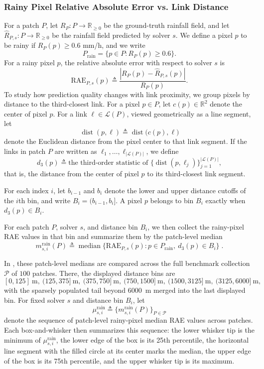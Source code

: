\documentclass[11pt]{article}
\begin{document}
\subsubsection{Rainy Pixel Relative Absolute Error vs. Link Distance}
For a patch $P$, let $R_P : P \to \mathbb{R}_{\ge 0}$ be the ground-truth rainfall field, and let $\widehat{R}_{P,s} : P \to \mathbb{R}_{\ge 0}$ be the rainfall field predicted by solver $s$. We define a pixel $p$ to be rainy if $R_P(p) \ge 0.6$ mm/h, and we write
\[
P_{\mathrm{rain}}=\{p \in P : R_P(p)\ge 0.6\}.
\]
For a rainy pixel $p$, the relative absolute error with respect to solver $s$ is
\[
\mathrm{RAE}_{P,s}(p)\triangleq\frac{|R_P(p)-\widehat{R}_{P,s}(p)|}{R_P(p)}.
\]
To study how prediction quality changes with link proximity, we group pixels by distance to the third-closest link. For a pixel $p\in P$, let $c(p)\in\mathbb{R}^2$ denote the center of pixel $p$. For a link $\ell\in\mathcal{L}(P)$, viewed geometrically as a line segment, let
\[
\operatorname{dist}(p,\ell)\triangleq \operatorname{dist}\bigl(c(p),\ell\bigr)
\]
denote the Euclidean distance from the pixel center to that link segment. If the links in patch $P$ are written as $\ell_1,\dots,\ell_{|\mathcal{L}(P)|}$, we define
\[
d_3(p)\triangleq \text{the third-order statistic of } \bigl\{\operatorname{dist}(p,\ell_j)\bigr\}_{j=1}^{|\mathcal{L}(P)|},
\]
that is, the distance from the center of pixel $p$ to its third-closest link segment.

For each index $i$, let $b_{i-1}$ and $b_i$ denote the lower and upper distance cutoffs of the $i$th bin, and write $B_i=(b_{i-1},b_i]$. A pixel $p$ belongs to bin $B_i$ exactly when $d_3(p)\in B_i$.

For each patch $P$, solver $s$, and distance bin $B_i$, we then collect the rainy-pixel RAE values in that bin and summarize them by the patch-level median
\[
m_{s,i}^{\mathrm{rain}}(P)\triangleq
\operatorname{median}\bigl\{\mathrm{RAE}_{P,s}(p): p\in 
P_{\mathrm{rain}},\ d_3(p)\in B_i
\bigr\}\;.
\]

In , these patch-level medians are compared across the full benchmark collection $\mathcal{P}$ of $100$ patches. There, the displayed distance bins are
\[
[0,125]\ \text{m},\ (125,375]\ \text{m},\ (375,750]\ \text{m},\ (750,1500]\ \text{m},\ (1500,3125]\ \text{m},\ (3125,6000]\ \text{m},
\]
with the sparsely populated tail beyond \SI{6000}{m} merged into the last displayed bin. For fixed solver $s$ and distance bin $B_i$, let
\[
\mu_{s,i}^{\mathrm{rain}} \triangleq \{m_{s,i}^{\mathrm{rain}}(P)\}_{P\in\mathcal{P}}
\]
denote the sequence of patch-level rainy-pixel median RAE values across patches. Each box-and-whisker then summarizes this sequence: the lower whisker tip is the minimum of $\mu_{s,i}^{\mathrm{rain}}$, the lower edge of the box is its 25th percentile, the horizontal line segment with the filled circle at its center marks the median, the upper edge of the box is its 75th percentile, and the upper whisker tip is its maximum.
\end{document}
